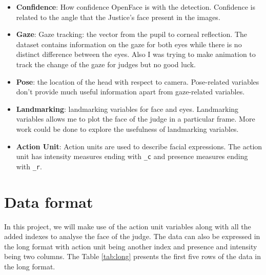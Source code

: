 \documentclass{monashthesis}
\begin{document}
\begin{itemize}
\item
  \textbf{Confidence}: How confidence OpenFace is with the detection. Confidence is related to the angle that the Justice's face present in the images.
\item
  \textbf{Gaze}: Gaze tracking: the vector from the pupil to corneal reflection. The dataset contains information on the gaze for both eyes while there is no distinct difference between the eyes. Also I was trying to make animation to track the change of the gaze for judges but no good luck.
\item
  \textbf{Pose}: the location of the head with respect to camera. Pose-related variables don't provide much useful information apart from gaze-related variables.
\item
  \textbf{Landmarking}: landmarking variables for face and eyes. Landmarking variables allows me to plot the face of the judge in a particular frame. More work could be done to explore the usefulness of landmarking variables.
\item
  \textbf{Action Unit}: Action units are used to describe facial expressions. The action unit has intensity measures ending with \texttt{\_c} and presence measures ending with \texttt{\_r}.
\end{itemize}

\hypertarget{data-format}{%
\section{Data format}\label{data-format}}

In this project, we will make use of the action unit variables along with all the added indexes to analyse the face of the judge. The data can also be expressed in the long format with action unit being another index and presence and intensity being two columns. The Table \ref{tab:long} presents the first five rows of the data in the long format.
\end{document}
